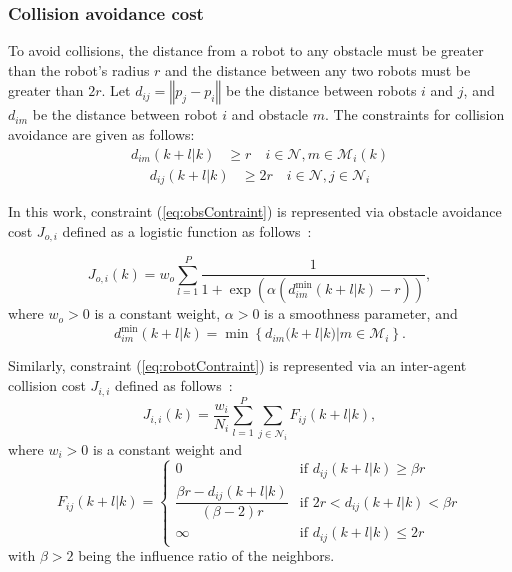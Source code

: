 \subsubsection{Collision avoidance cost}
To avoid collisions, the distance from a robot to any obstacle must be greater than the robot's radius $r$ and the distance between any two robots must be greater than $2r$. Let $d_{ij}=\left\Vert p_j-p_i\right\Vert$ be the distance between robots $i$ and $j$, and $d_{im}$ be the distance between robot $i$ and obstacle $m$. The constraints for collision avoidance  are given as follows:
\begin{equation}
\begin{aligned}
    d_{im}(k+l|k)&\geq r \quad i\in\mathcal{N}, m\in\mathcal{M}_i(k)
    \label{eq:obsContraint}
\end{aligned}
\end{equation}
\begin{equation}
\begin{aligned}
    d_{ij}(k+l|k)&\geq 2r \quad i\in\mathcal{N},j\in\mathcal{N}_i
    \label{eq:robotContraint}
\end{aligned}
\end{equation}

In this work, constraint (\ref{eq:obsContraint}) is represented via obstacle avoidance cost $J_{o,i}$ defined as a logistic function as follows~\cite{8202163}:   

\begin{equation}
    J_{o,i}(k) = w_o\sum_{l=1}^P \dfrac{1}{1 + \exp{\left(\alpha\left(d_{im}^\text{min}(k+l|k) - r\right)\right)}},
\end{equation}
where $w_o > 0$ is a constant weight, $\alpha > 0$ is a smoothness parameter, and
\begin{equation}
    d_{im}^\text{min}(k+l|k)=\min\left\{d_{im}(k+l|k)|m\in\mathcal{M}_i\right\}.
\end{equation}

Similarly, constraint (\ref{eq:robotContraint}) is represented via an inter-agent collision cost $J_{i,i}$ defined as follows~\cite{736776}:
\begin{equation}
    J_{i,i}(k)=\dfrac{w_i}{N_i}\sum_{l=1}^P{\sum_{j\in\mathcal{N}_i}}F_{ij}(k+l|k),
\end{equation}
where $w_i>0$ is a constant weight and  
\begin{equation}
    F_{ij}(k+l|k)=\begin{cases}
        0   & \text{if } d_{ij}(k+l|k) \geq \beta r\\
        \dfrac{\beta r-d_{ij}(k+l|k)}{(\beta-2)r}    & \text{if } 2r < d_{ij}(k+l|k) < \beta r\\
        \infty  & \text{if } d_{ij}(k+l|k) \leq 2r
    \end{cases}
\end{equation} 
with $\beta>2$ being the influence ratio of the neighbors.

